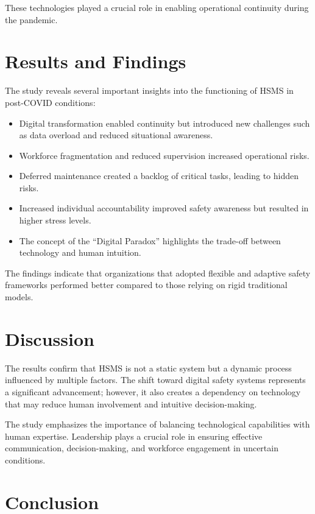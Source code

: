 \documentclass[conference]{IEEEtran}
\begin{document}
These technologies played a crucial role in enabling operational continuity during the pandemic.

\section{Results and Findings}

The study reveals several important insights into the functioning of HSMS in post-COVID conditions:

\begin{itemize}
\item Digital transformation enabled continuity but introduced new challenges such as data overload and reduced situational awareness.
\item Workforce fragmentation and reduced supervision increased operational risks.
\item Deferred maintenance created a backlog of critical tasks, leading to hidden risks.
\item Increased individual accountability improved safety awareness but resulted in higher stress levels.
\item The concept of the ``Digital Paradox'' highlights the trade-off between technology and human intuition.
\end{itemize}

The findings indicate that organizations that adopted flexible and adaptive safety frameworks performed better compared to those relying on rigid traditional models.

\section{Discussion}

The results confirm that HSMS is not a static system but a dynamic process influenced by multiple factors. The shift toward digital safety systems represents a significant advancement; however, it also creates a dependency on technology that may reduce human involvement and intuitive decision-making.

The study emphasizes the importance of balancing technological capabilities with human expertise. Leadership plays a crucial role in ensuring effective communication, decision-making, and workforce engagement in uncertain conditions.

\section{Conclusion}
\end{document}

